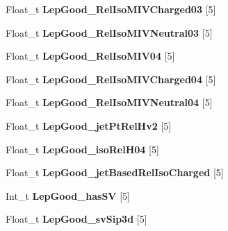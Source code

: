 \begin{DoxyCompactItemize}
\item 
\hypertarget{classMiniTree_a6e6a6e88ea9a21077fa530b210dce7aa}{}\label{classMiniTree_a6e6a6e88ea9a21077fa530b210dce7aa} 
Float\+\_\+t {\bfseries Lep\+Good\+\_\+\+Rel\+Iso\+M\+I\+V\+Charged03} \mbox{[}5\mbox{]}
\item 
\hypertarget{classMiniTree_ada78429652c00444badc479ae82f09dd}{}\label{classMiniTree_ada78429652c00444badc479ae82f09dd} 
Float\+\_\+t {\bfseries Lep\+Good\+\_\+\+Rel\+Iso\+M\+I\+V\+Neutral03} \mbox{[}5\mbox{]}
\item 
\hypertarget{classMiniTree_a3fa85de722232f56268ffba3e9384931}{}\label{classMiniTree_a3fa85de722232f56268ffba3e9384931} 
Float\+\_\+t {\bfseries Lep\+Good\+\_\+\+Rel\+Iso\+M\+I\+V04} \mbox{[}5\mbox{]}
\item 
\hypertarget{classMiniTree_aa32eb7de9304b1d5ef1e7a1b08aae52b}{}\label{classMiniTree_aa32eb7de9304b1d5ef1e7a1b08aae52b} 
Float\+\_\+t {\bfseries Lep\+Good\+\_\+\+Rel\+Iso\+M\+I\+V\+Charged04} \mbox{[}5\mbox{]}
\item 
\hypertarget{classMiniTree_a2f620b2d352ee00ca92fe01b9683b1b9}{}\label{classMiniTree_a2f620b2d352ee00ca92fe01b9683b1b9} 
Float\+\_\+t {\bfseries Lep\+Good\+\_\+\+Rel\+Iso\+M\+I\+V\+Neutral04} \mbox{[}5\mbox{]}
\item 
\hypertarget{classMiniTree_a727a9efd7da09775ce587882693383a3}{}\label{classMiniTree_a727a9efd7da09775ce587882693383a3} 
Float\+\_\+t {\bfseries Lep\+Good\+\_\+jet\+Pt\+Rel\+Hv2} \mbox{[}5\mbox{]}
\item 
\hypertarget{classMiniTree_a35bc62f04e18cbcaa046d501a0ba69d4}{}\label{classMiniTree_a35bc62f04e18cbcaa046d501a0ba69d4} 
Float\+\_\+t {\bfseries Lep\+Good\+\_\+iso\+Rel\+H04} \mbox{[}5\mbox{]}
\item 
\hypertarget{classMiniTree_ad3c4a3f69fac2fa1c56dc7c3bb263148}{}\label{classMiniTree_ad3c4a3f69fac2fa1c56dc7c3bb263148} 
Float\+\_\+t {\bfseries Lep\+Good\+\_\+jet\+Based\+Rel\+Iso\+Charged} \mbox{[}5\mbox{]}
\item 
\hypertarget{classMiniTree_a670bb7ed2f4ddc9d2f416ac866d6b40f}{}\label{classMiniTree_a670bb7ed2f4ddc9d2f416ac866d6b40f} 
Int\+\_\+t {\bfseries Lep\+Good\+\_\+has\+SV} \mbox{[}5\mbox{]}
\item 
\hypertarget{classMiniTree_a045faa85bdbd2c71ee642703d8c4d187}{}\label{classMiniTree_a045faa85bdbd2c71ee642703d8c4d187} 
Float\+\_\+t {\bfseries Lep\+Good\+\_\+sv\+Sip3d} \mbox{[}5\mbox{]}
\item 
\hypertarget{classMiniTree_a75a5cfdeebffc6938a556c6ec8e2a3b0}{}\label{classMiniTree_a75a5cfdeebffc6938a556c6ec8e2a3b0} 

\end{DoxyCompactItemize}
